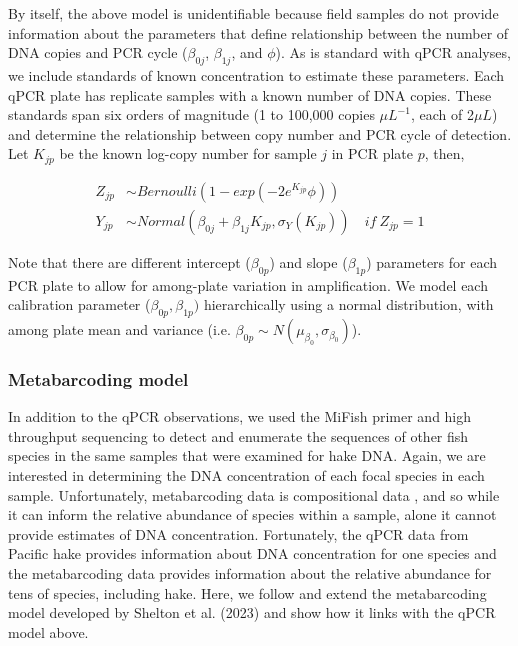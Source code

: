 \documentclass{article}
\begin{document}
By itself, the above model is unidentifiable because field samples do not provide information about the parameters that define relationship between the number of DNA copies and PCR cycle ($\beta_{0j}$, $\beta_{1j}$, and $\phi$). As is standard with qPCR analyses, we include standards of known concentration to estimate these parameters. Each qPCR plate has replicate samples with a known number of DNA copies. These standards span six orders of magnitude (1 to 100,000 copies $\mu L^{-1}$, each of 2$\mu L$) and determine the relationship between copy number and PCR cycle of detection. Let $K_{jp}$ be the known log-copy number for sample $j$ in PCR plate $p$, then,

\begin{align}
  Z_{jp} &\sim Bernoulli \left(1-exp(-2 e^{K_{jp}} \phi) \right)\\
  Y_{jp} &\sim Normal \left(\beta_{0j}+\beta_{1j}{K_{jp}},\sigma_Y(K_{jp})\right) \quad  if \: Z_{jp} =1
\end{align}

Note that there are different intercept ($\beta_{0p}$) and slope ($\beta_{1p}$) parameters for each PCR plate to allow for among-plate variation in amplification. We model each calibration parameter ($\beta_{0p},\beta_{1p})$ hierarchically using a normal distribution, with among plate mean and variance (i.e. $\beta_{0p} \sim N(\mu_{\beta_{0}},\sigma_{\beta_{0}})$).

\subsubsection*{Metabarcoding model}

In addition to the qPCR observations, we used the MiFish primer and high throughput sequencing to detect and enumerate the sequences of other fish species in the same samples that were examined for hake DNA. Again, we are interested in determining the DNA concentration of each focal species in each sample. Unfortunately, metabarcoding data is compositional data \cite{glor2017, shelton2023}, and so while it can inform the relative abundance of species within a sample, alone it cannot provide estimates of DNA concentration. Fortunately, the qPCR data from Pacific hake provides information about DNA concentration for one species and the metabarcoding data provides information about the relative abundance for tens of species, including hake. Here, we follow and extend the metabarcoding model developed by Shelton et al. (2023) and show how it links with the qPCR model above. 
\end{document}
